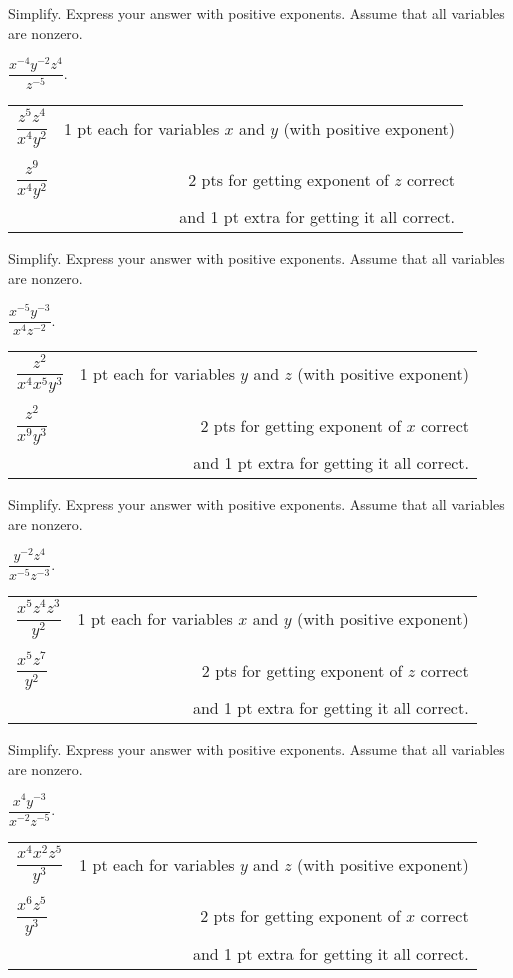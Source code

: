 {
	Simplify. Express your answer with positive exponents. Assume that all variables are nonzero. 
	
	\bigskip \noindent $\dfrac{x^{-4}y^{-2}z^4}{z^{-5}}$.
}
{
	\begin{tabular}{l r}
	$\dfrac{z^5z^4}{x^4y^2}$ & 1 pt each for variables $x$ and $y$ (with positive exponent)\\ \\
	$\dfrac{z^9}{x^4y^2}$ & 2 pts for getting exponent of $z$ correct\\
	& and 1 pt extra for getting it all correct.
	\end{tabular}
}

{
	Simplify. Express your answer with positive exponents. Assume that all variables are nonzero. 
	
	\bigskip \noindent $\dfrac{x^{-5}y^{-3}}{x^4z^{-2}}$.
}
{
	\begin{tabular}{l r}
	$\dfrac{z^2}{x^4x^5y^3}$ & 1 pt each for variables $y$ and $z$ (with positive exponent)\\ \\
	$\dfrac{z^2}{x^9y^3}$ & 2 pts for getting exponent of $x$ correct\\
	& and 1 pt extra for getting it all correct.
	\end{tabular}
}

{
	Simplify. Express your answer with positive exponents. Assume that all variables are nonzero. 
	
	\bigskip \noindent $\dfrac{y^{-2}z^4}{x^{-5}z^{-3}}$.
}
{
	\begin{tabular}{l r}
	$\dfrac{x^5z^4z^3}{y^2}$ & 1 pt each for variables $x$ and $y$ (with positive exponent)\\ \\
	$\dfrac{x^5z^7}{y^2}$ & 2 pts for getting exponent of $z$ correct\\
	& and 1 pt extra for getting it all correct.
	\end{tabular}
}

{
	Simplify. Express your answer with positive exponents. Assume that all variables are nonzero. 
	
	\bigskip \noindent $\dfrac{x^{4}y^{-3}}{x^{-2}z^{-5}}$.
}
{
	\begin{tabular}{l r}
	$\dfrac{x^4x^2z^5}{y^3}$ & 1 pt each for variables $y$ and $z$ (with positive exponent)\\ \\
	$\dfrac{x^6z^5}{y^3}$ & 2 pts for getting exponent of $x$ correct\\
	& and 1 pt extra for getting it all correct.
	\end{tabular}
}
